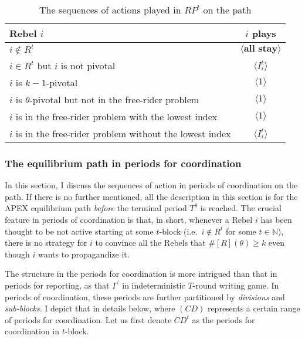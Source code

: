\documentclass[12pt,letter]{article}
\theoremstyle{definition}
\theoremstyle{remark}
\theoremstyle{claim}
\begin{document}
\begin{table}[!htbp]
\caption{The sequences of actions played in $RP^t$ on the path}
\label{Table_msg_RP_path}
\begin{center}
\begin{tabular}{l c}
Rebel $i$ & $i$ plays\\
\hline
\hline
$i\notin R^t$				& $\langle \textbf{all stay} \rangle$  \\
$i\in R^t$ but $i$ is not pivotal	 					 			& $\langle I^t_i \rangle$  \\
$i$ is $k-1$-pivotal	 					 			& $\langle 1 \rangle$  \\
$i$ is $\theta$-pivotal but not in the free-rider problem	 					 			& $\langle 1 \rangle$  \\
$i$ is in the free-rider problem with the lowest index	 					 			& $\langle 1 \rangle$  \\
$i$ is in the free-rider problem without the lowest index	 					 			& $\langle I^t_i \rangle$  \\
\hline
\end{tabular}
\end{center}
\end{table}


\subsubsection{The equilibrium path in periods for coordination}
\label{sec:eq_cd}
In this section, I discuss the sequences of action in periods of coordination on the path. If there is no further mentioned, all the description in this section is for the APEX equilibrium path \textit{before} the terminal period $T^{\theta}$ is reached. The crucial feature in periods of coordination is that, in short, whenever a Rebel $i$ has been thought to be not active starting at some $t$-block (i.e.~$i\notin R^t$ for some $t\in \mathbb{N}$), there is no strategy for $i$ to convince all the Rebels that $\#[R](\theta)\geq k$ even though $i$ wants to propagandize it.

The structure in the periods for coordination is more intrigued than that in periods for reporting, as that $\Gamma^{'}$ in indeterministic $T$-round writing game. In periods of coordination, these periods are further partitioned by \textit{divisions} and \textit{sub-blocks}. I depict that in details below, where $(CD)$ represents a certain range of periods for coordination. Let us first denote $CD^{t}$ as the periods for coordination in $t$-block.
\end{document}
